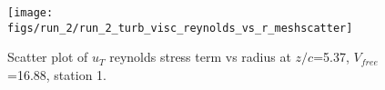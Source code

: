 \begin{figure}[H]
\centering
\texttt{[image: figs/run\_2/run\_2\_turb\_visc\_reynolds\_vs\_r\_meshscatter]}
\caption{Scatter plot of $
u_T$ reynolds stress term vs radius at $z/c$=5.37, $V_{free}$=16.88, station 1.}
\label{fig:run_2_turb_visc_reynolds_vs_r_meshscatter}
\end{figure}


